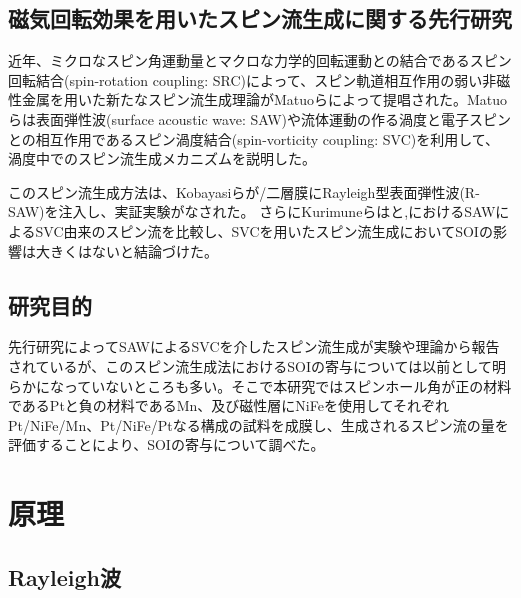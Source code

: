 \documentclass[dvipdfmx,11pt]{jsreport}
\numberwithin{equation}{chapter}
\numberwithin{table}{chapter}
\begin{document}
\section{磁気回転効果を用いたスピン流生成に関する先行研究}
近年、ミクロなスピン角運動量とマクロな力学的回転運動との結合であるスピン回転結合(spin-rotation coupling: SRC)によって、スピン軌道相互作用の弱い非磁性金属を用いた新たなスピン流生成理論がMatuoらによって提唱された\cite{PhysRevB.87.180402}。Matuoらは表面弾性波(surface acoustic wave: SAW)や流体運動の作る渦度と電子スピンとの相互作用であるスピン渦度結合(spin-vorticity coupling: SVC)を利用して、渦度中でのスピン流生成メカニズムを説明した。

このスピン流生成方法は、Kobayasiらが/二層膜にRayleigh型表面弾性波(R-SAW)を注入し、実証実験がなされた\cite{PhysRevLett.119.077202}。
さらにKurimuneらはと,におけるSAWによるSVC由来のスピン流を比較し、SVCを用いたスピン流生成においてSOIの影響は大きくはないと結論づけた\cite{PhysRevB.102.174413}。
\section{研究目的}
先行研究によってSAWによるSVCを介したスピン流生成が実験や理論から報告されているが、このスピン流生成法におけるSOIの寄与については以前として明らかになっていないところも多い。そこで本研究ではスピンホール角が正の材料であるPtと負の材料であるMn、及び磁性層にNiFeを使用してそれぞれPt/NiFe/Mn、Pt/NiFe/Ptなる構成の試料を成膜し、生成されるスピン流の量を評価することにより、SOIの寄与について調べた。
\chapter{原理}
\section{Rayleigh波}
\end{document}
